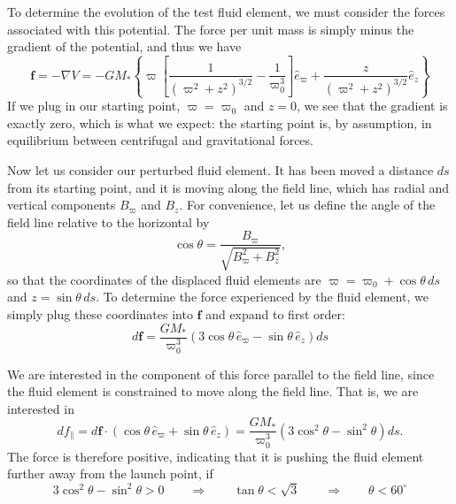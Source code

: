 To determine the evolution of the test fluid element, we must consider the forces associated with this potential. The force per unit mass  is simply minus the gradient of the potential, and thus we have
\begin{equation}
\mathbf{f} = -\nabla V = -GM_* \left\{ \varpi \left[\frac{1}{(\varpi^2+z^2)^{3/2}} - \frac{1}{\varpi_0^3}\right]\hat{e}_\varpi + \frac{z}{(\varpi^2+z^2)^{3/2}} \hat{e}_z \right\}
\end{equation}
If we plug in our starting point, $\varpi = \varpi_0$ and $z=0$, we see that the gradient is exactly zero, which is what we expect: the starting point is, by assumption, in equilibrium between centrifugal and gravitational forces.

Now let us consider our perturbed fluid element. It has been moved a distance $ds$ from its starting point, and it is moving along the field line, which has radial and vertical components $B_\varpi$ and $B_z$. For convenience, let us define the angle of the field line relative to the horizontal by
\begin{equation}
\cos \theta = \frac{B_\varpi}{\sqrt{B_\varpi^2 + B_z^2}},
\end{equation}
so that the coordinates of the displaced fluid elements are $\varpi = \varpi_0 + \cos\theta \, ds$ and $z = \sin\theta \, ds$. To determine the force experienced by the fluid element, we simply plug these coordinates into $\mathbf{f}$ and expand to first order:
\begin{equation}
d\mathbf{f} = \frac{GM_*}{\varpi_0^3} \left(3 \cos\theta\,\hat{e}_\varpi - \sin\theta\,\hat{e}_z\right) ds
\end{equation}

We are interested in the component of this force parallel to the field line, since the fluid element is constrained to move along the field line. That is, we are interested in
\begin{equation}
df_\parallel = d\mathbf{f} \cdot (\cos\theta\,\hat{e}_\varpi +  \sin \theta\,\hat{e}_z) = \frac{GM_*}{\varpi_0^3} \left(3\cos^2 \theta - \sin^2 \theta\right) ds.
\end{equation}
The force is therefore positive, indicating that it is pushing the fluid element further away from the launch point, if
\begin{equation}
3 \cos^2 \theta - \sin^2 \theta > 0
\qquad\Longrightarrow\qquad
\tan\theta < \sqrt{3}
\qquad\Longrightarrow\qquad
\theta < 60^\circ
\end{equation}

